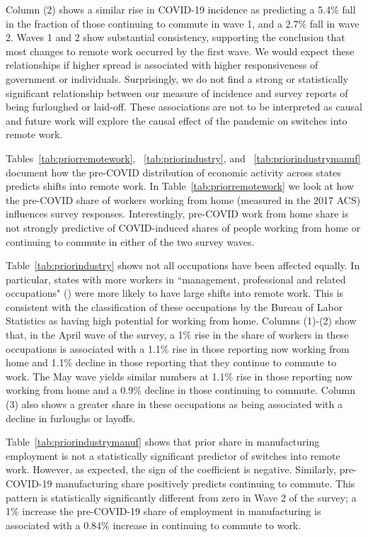 \documentclass[12pt]{article}
\begin{document}
Column (2) shows a similar rise in COVID-19 incidence as predicting a 5.4\% fall in the fraction of those continuing to commute in wave 1, and a 2.7\% fall in wave 2. Waves 1 and 2 show substantial consistency, supporting the conclusion that most changes to remote work occurred by the first wave. We would expect these relationships if higher spread is associated with higher responsiveness of government or individuals. Surprisingly, we do not find a strong or statistically significant relationship between our measure of incidence and survey reports of being furloughed or laid-off. These associations are not to be interpreted as causal and future work will explore the causal effect of the pandemic on switches into remote work.



Tables~\ref{tab:priorremotework}, ~\ref{tab:priorindustry}, and ~\ref{tab:priorindustrymanuf} document how the pre-COVID distribution of economic activity across states predicts shifts into remote work. In Table~\ref{tab:priorremotework} we look at how the pre-COVID share of workers working from home (measured in the 2017 ACS) influences survey responses.  Interestingly, pre-COVID work from home share is not strongly predictive of COVID-induced shares of people working from home or continuing to commute in either of the two survey waves. 



Table~\ref{tab:priorindustry} shows not all occupations have been affected equally.  In particular, states with more workers in ``management, professional and related occupations" (\cite{krantz2019did}) were more likely to have large shifts into remote work. This is consistent with the classification of these occupations by the Bureau of Labor Statistics as having high potential for working from home. Columns (1)-(2) show that, in the April wave of the survey, a 1\% rise in the share of workers in these occupations is associated with a 1.1\% rise in those reporting now working from home and 1.1\% decline in those reporting that they continue to commute to work. The May wave yields similar numbers at 1.1\% rise in those reporting now working from home and a 0.9\% decline in those continuing to commute. Column (3) also shows a greater share in these occupations as being associated with a decline in furloughs or layoffs. 



Table~\ref{tab:priorindustrymanuf} shows that prior share in manufacturing employment is not a statistically significant predictor of switches into remote work. However, as expected, the sign of the coefficient is negative. Similarly, pre-COVID-19 manufacturing share positively predicts continuing to commute. This pattern is statistically significantly different from zero in Wave 2 of the survey; a 1\% increase the pre-COVID-19 share of employment in manufacturing is associated with a 0.84\% increase in continuing to commute to work.
\end{document}
